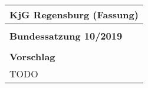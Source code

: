 \begin{table}[H]
	\begin{tabular}{|l|}
		\hline
		\rowcolor[HTML]{FFCC67} 
		\rule[-1ex]{0pt}{4ex} \textbf{KjG Regensburg (Fassung)}        \\ \hline
		\rule[-1ex]{0pt}{4ex} \begin{minipage}[t]{\textwidth} 
		
		\rule[-1.2ex]{0pt}{0pt}
		\end{minipage}
		\\ \hline
		\rowcolor[HTML]{CBCEFB} 
		\rule[-1ex]{0pt}{4ex}\textbf{Bundessatzung 10/2019} \\ \hline
		\rule[-1ex]{0pt}{4ex}\begin{minipage}[t]{\textwidth} 
		
		\rule[-1.2ex]{0pt}{0pt}
		\end{minipage}
	\\ \hline
		\rowcolor[HTML]{9AFF99} 
		\rule[-1ex]{0pt}{4ex}\textbf{Vorschlag}             \\ \hline
		\rule[-1ex]{0pt}{4ex}\begin{minipage}[t]{\textwidth} 
		TODO %
		\end{minipage}
		\\ \hline
	\end{tabular}
\end{table}